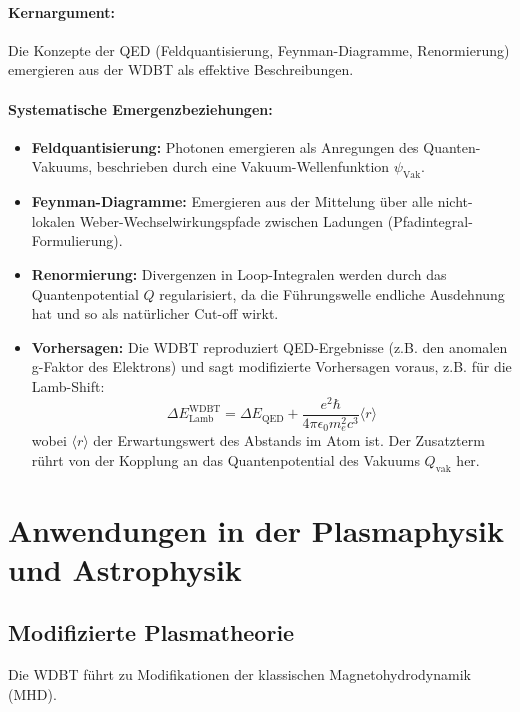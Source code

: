 \documentclass[11pt, a4paper]{article}
\begin{document}
\paragraph{Kernargument:} Die Konzepte der QED (Feldquantisierung, Feynman-Diagramme, Renormierung) emergieren aus der WDBT als effektive Beschreibungen.

\paragraph{Systematische Emergenzbeziehungen:}
\begin{itemize}
    \item \textbf{Feldquantisierung:} Photonen emergieren als Anregungen des Quanten-Vakuums, beschrieben durch eine Vakuum-Wellenfunktion $\psi_{\text{Vak}}$.
    \item \textbf{Feynman-Diagramme:} Emergieren aus der Mittelung über alle nicht-lokalen Weber-Wechselwirkungspfade zwischen Ladungen (Pfadintegral-Formulierung).
    \item \textbf{Renormierung:} Divergenzen in Loop-Integralen werden durch das Quantenpotential $Q$ regularisiert, da die Führungswelle endliche Ausdehnung hat und so als natürlicher Cut-off wirkt.
    \item \textbf{Vorhersagen:} Die WDBT reproduziert QED-Ergebnisse (z.B. den anomalen g-Faktor des Elektrons) und sagt modifizierte Vorhersagen voraus, z.B. für die Lamb-Shift:
    \begin{equation}
    \label{eq:lamb_shift}
    \Delta E^{\text{WDBT}}_{\text{Lamb}} = \Delta E_{\text{QED}} + \frac{e^2 \hbar}{4\pi\epsilon_0 m_e^2 c^3} \langle r \rangle
    \end{equation}
    wobei $\langle r \rangle$ der Erwartungswert des Abstands im Atom ist. Der Zusatzterm rührt von der Kopplung an das Quantenpotential des Vakuums $Q_{\text{vak}}$ her.
\end{itemize}

\section{Anwendungen in der Plasmaphysik und Astrophysik}
\label{sec:anwendungen}

\subsection{Modifizierte Plasmatheorie}
\label{subsec:plasma}

Die WDBT führt zu Modifikationen der klassischen Magnetohydrodynamik (MHD).
\end{document}
